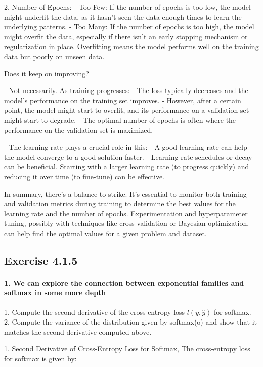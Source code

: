 2. Number of Epochs:
- Too Few: If the number of epochs is too low, the model might underfit the data, as it hasn't seen the data enough times to learn the underlying patterns.
- Too Many: If the number of epochs is too high, the model might overfit the data, especially if there isn't an early stopping mechanism or regularization in place. Overfitting means the model performs well on the training data but poorly on unseen data.

Does it keep on improving?

- Not necessarily. As training progresses:
- The loss typically decreases and the model's performance on the training set improves.
- However, after a certain point, the model might start to overfit, and its performance on a validation set might start to degrade.
- The optimal number of epochs is often where the performance on the validation set is maximized.

- The learning rate plays a crucial role in this:
- A good learning rate can help the model converge to a good solution faster.
- Learning rate schedules or decay can be beneficial. Starting with a larger learning rate (to progress quickly) and reducing it over time (to fine-tune) can be effective.

In summary, there's a balance to strike.
It's essential to monitor both training and validation metrics during training to determine the best values for the learning rate and the number of epochs.
Experimentation and hyperparameter tuning, possibly with techniques like cross-validation or Bayesian optimization, can help find the optimal values for a given problem and dataset.


\subsection{Exercise 4.1.5}

\paragraph{1. We can explore the connection between exponential families and softmax in some more depth}

1. Compute the second derivative of the cross-entropy loss \(l(y, \hat{y})\) for softmax.
2. Compute the variance of the distribution given by softmax(o) and show that it matches the second derivative computed above.

1. Second Derivative of Cross-Entropy Loss for Softmax, The cross-entropy loss for softmax is given by:

